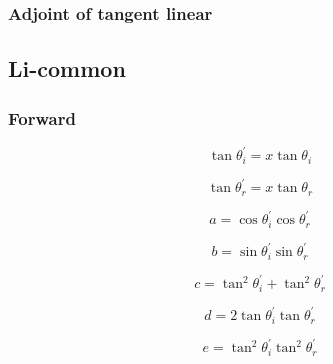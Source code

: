 \subsubsection{Adjoint of tangent linear}
\label{sec:brdf_kernels-roujean-adjoint_of_tangent_linear}


%
\subsection{Li-common}
\label{sec:brdf_kernels-li_common}

\subsubsection{Forward}
\label{sec:brdf_kernels-li_common-forward}

\begin{equation}
\tan\theta^{\prime}_{i} = x\tan\theta_{i}
\label{eq:brdf_kernels-li_common-forward-tan_theta_i_prime}
\end{equation}

\begin{equation}
\tan\theta^{\prime}_{r} = x\tan\theta_{r}
\label{eq:brdf_kernels-li_common-forward-tan_theta_r_prime}
\end{equation}

\begin{equation}
a = \cos\theta^{\prime}_{i} \cos\theta^{\prime}_{r}
\label{eq:brdf_kernels-li_common-forward-a}
\end{equation}

\begin{equation}
b = \sin\theta^{\prime}_{i} \sin\theta^{\prime}_{r}
\label{eq:brdf_kernels-li_common-forward-b}
\end{equation}

\begin{equation}
c = \tan^{2}\theta^{\prime}_{i} + \tan^{2}\theta^{\prime}_{r}
\label{eq:brdf_kernels-li_common-forward-c}
\end{equation}

\begin{equation}
d = 2 \tan\theta^{\prime}_{i} \tan\theta^{\prime}_{r}
\label{eq:brdf_kernels-li_common-forward-d}
\end{equation}

\begin{equation}
e = \tan^{2}\theta^{\prime}_{i} \tan^{2}\theta^{\prime}_{r}
\label{eq:brdf_kernels-li_common-forward-e}
\end{equation}

